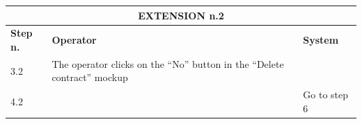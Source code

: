 {{{\begin{center}
			\begin{tabular}{|p{2cm}|p{6cm}|p{6cm}|}
			\hline
				\multicolumn{3}{|c|}{EXTENSION n.2} \\
			\hline
				\vspace{1mm} \bfseries{Step n.} \vspace{1mm} & 
				\vspace{1mm} \bfseries{Operator} \vspace{1mm} & 
				\vspace{1mm} \bfseries{System} \vspace{1mm}\\
			\hline
				\vspace{1mm} 3.2 \vspace{1mm} &
				\vspace{1mm} The operator clicks on the “No”  button  in the “Delete contract”  mockup \vspace{1mm} & 
				\vspace{1mm} \vspace{1mm} \\
			\hline
				\vspace{1mm} 4.2 \vspace{1mm} &
				\vspace{1mm} \vspace{1mm} & 
				\vspace{1mm} Go to step 6 \vspace{1mm} \\
			\hline
			\end{tabular}
			\end{center}
			
			\clearpage

}}}
